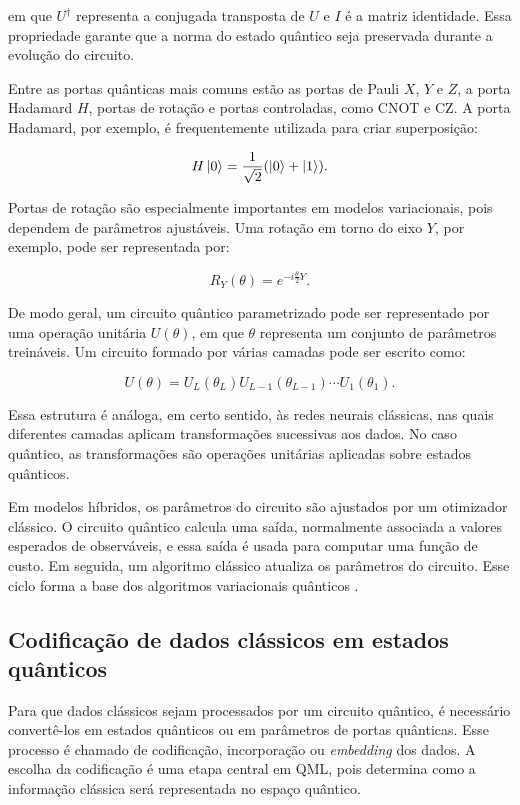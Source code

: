\documentclass[
    12pt,
    openright,
    oneside,
    a4paper,
    english,
    brazil
]{abntex2}
\begin{document}
em que \(U^\dagger\) representa a conjugada transposta de \(U\) e \(I\) é a matriz identidade. Essa propriedade garante que a norma do estado quântico seja preservada durante a evolução do circuito.

Entre as portas quânticas mais comuns estão as portas de Pauli \(X\), \(Y\) e \(Z\), a porta Hadamard \(H\), portas de rotação e portas controladas, como CNOT e CZ. A porta Hadamard, por exemplo, é frequentemente utilizada para criar superposição:

\[
H\ket{0} =
\frac{1}{\sqrt{2}}
(\ket{0} + \ket{1}).
\]

Portas de rotação são especialmente importantes em modelos variacionais, pois dependem de parâmetros ajustáveis. Uma rotação em torno do eixo \(Y\), por exemplo, pode ser representada por:

\[
R_Y(\theta) =
e^{-i\frac{\theta}{2}Y}.
\]

De modo geral, um circuito quântico parametrizado pode ser representado por uma operação unitária \(U(\theta)\), em que \(\theta\) representa um conjunto de parâmetros treináveis. Um circuito formado por várias camadas pode ser escrito como:

\[
U(\theta) =
U_L(\theta_L)
U_{L-1}(\theta_{L-1})
\cdots
U_1(\theta_1).
\]

Essa estrutura é análoga, em certo sentido, às redes neurais clássicas, nas quais diferentes camadas aplicam transformações sucessivas aos dados. No caso quântico, as transformações são operações unitárias aplicadas sobre estados quânticos.

Em modelos híbridos, os parâmetros do circuito são ajustados por um otimizador clássico. O circuito quântico calcula uma saída, normalmente associada a valores esperados de observáveis, e essa saída é usada para computar uma função de custo. Em seguida, um algoritmo clássico atualiza os parâmetros do circuito. Esse ciclo forma a base dos algoritmos variacionais quânticos \cite{cerezo2021variational}.

\subsection{Codificação de dados clássicos em estados quânticos}

Para que dados clássicos sejam processados por um circuito quântico, é necessário convertê-los em estados quânticos ou em parâmetros de portas quânticas. Esse processo é chamado de codificação, incorporação ou \textit{embedding} dos dados. A escolha da codificação é uma etapa central em QML, pois determina como a informação clássica será representada no espaço quântico.
\end{document}
